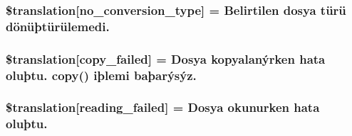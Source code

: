 \subsubsection[{\$translation}]{\setlength{\rightskip}{0pt plus 5cm}\$translation\mbox{[}\textquotesingle{}no\+\_\+conversion\+\_\+type\textquotesingle{}\mbox{]} = \textquotesingle{}Belirtilen dosya türü dönüþtürülemedi.\textquotesingle{}}\label{class_8upload_8tr___t_r_8php_a4712d7ec28e9a7f17eb3338af2358363}
\hypertarget{class_8upload_8tr___t_r_8php_a783c9358bcf54a054545b50098bc679b}{}
\subsubsection[{\$translation}]{\setlength{\rightskip}{0pt plus 5cm}\$translation\mbox{[}\textquotesingle{}copy\+\_\+failed\textquotesingle{}\mbox{]} = \textquotesingle{}Dosya kopyalanýrken hata oluþtu. copy() iþlemi baþarýsýz.\textquotesingle{}}\label{class_8upload_8tr___t_r_8php_a783c9358bcf54a054545b50098bc679b}
\hypertarget{class_8upload_8tr___t_r_8php_a01bea14c9fd5f353f62db44beabfcd42}{}
\subsubsection[{\$translation}]{\setlength{\rightskip}{0pt plus 5cm}\$translation\mbox{[}\textquotesingle{}reading\+\_\+failed\textquotesingle{}\mbox{]} = \textquotesingle{}Dosya okunurken hata oluþtu.\textquotesingle{}}\label{class_8upload_8tr___t_r_8php_a01bea14c9fd5f353f62db44beabfcd42}
